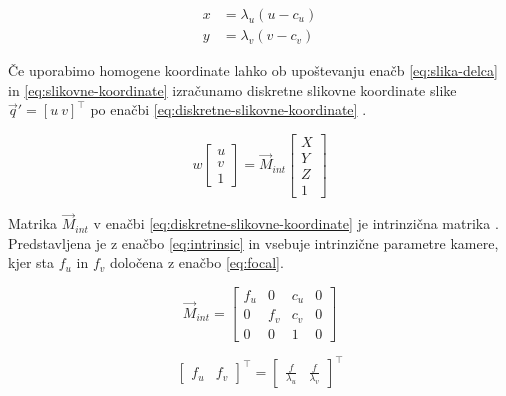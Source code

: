 \begin{subequations}
\begin{align}
	x &= \lambda_u (u - c_u) \\
    y &= \lambda_v (v - c_v)
\end{align}
\label{eq:slikovne-koordinate}
\end{subequations}

Če uporabimo homogene koordinate lahko ob upoštevanju enačb \eqref{eq:slika-delca} in \eqref{eq:slikovne-koordinate} izračunamo diskretne slikovne koordinate slike $\vec{q}' = \left[ u~ v \right]^\top$ po enačbi \eqref{eq:diskretne-slikovne-koordinate} \cite{trucco1998introductory}.


\begin{equation}
	w \begin{bmatrix}
	u \\ v \\ 1
	\end{bmatrix} = \vec{M}_{int}
    \begin{bmatrix}
    X \\ Y \\ Z \\ 1
    \end{bmatrix}
    \label{eq:diskretne-slikovne-koordinate}
\end{equation}

Matrika $\vec{M}_{int}$ v enačbi \eqref{eq:diskretne-slikovne-koordinate} je intrinzična matrika \cite{trucco1998introductory}. Predstavljena je z enačbo \eqref{eq:intrinsic} in vsebuje intrinzične parametre kamere, kjer sta $f_u$ in $f_v$ določena z enačbo \eqref{eq:focal}.

\begin{equation}
\vec{M}_{int} = \begin{bmatrix}
	f_u & 0 & c_u & 0 \\
    0 & f_v & c_v & 0 \\
    0 & 0 & 1 & 0
\end{bmatrix}
\label{eq:intrinsic}
\end{equation}

\begin{equation}
\begin{bmatrix}
	f_u & f_v
\end{bmatrix}^\top = \begin{bmatrix}
	\frac{f}{\lambda_u} & \frac{f}{\lambda_v}
\end{bmatrix}^\top
\label{eq:focal}
\end{equation}


